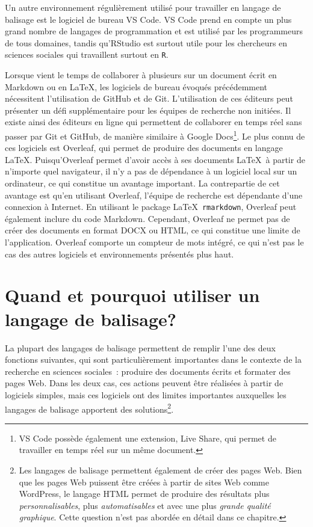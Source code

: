 \documentclass[
  letterpaper,
]{scrbook}
\begin{document}
Un autre environnement régulièrement utilisé pour travailler en langage
de balisage est le logiciel de bureau VS Code. VS Code prend en compte
un plus grand nombre de langages de programmation et est utilisé par les
programmeurs de tous domaines, tandis qu'RStudio est surtout utile pour
les chercheurs en sciences sociales qui travaillent surtout en
\texttt{R}.

Lorsque vient le temps de collaborer à plusieurs sur un document écrit
en Markdown ou en \LaTeX, les logiciels de bureau évoqués précédemment
nécessitent l'utilisation de GitHub et de Git. L'utilisation de ces
éditeurs peut présenter un défi supplémentaire pour les équipes de
recherche non initiées. Il existe ainsi des éditeurs en ligne qui
permettent de collaborer en temps réel sans passer par Git et GitHub, de
manière similaire à Google Docs\footnote{VS Code possède également une
  extension, Live Share, qui permet de travailler en temps réel sur un
  même document.}. Le plus connu de ces logiciels est Overleaf, qui
permet de produire des documents en langage \LaTeX. Puisqu'Overleaf
permet d'avoir accès à ses documents \LaTeX~à partir de n'importe quel
navigateur, il n'y a pas de dépendance à un logiciel local sur un
ordinateur, ce qui constitue un avantage important. La contrepartie de
cet avantage est qu'en utilisant Overleaf, l'équipe de recherche est
dépendante d'une connexion à Internet. En utilisant le package
\LaTeX~\texttt{rmarkdown}, Overleaf peut également inclure du code
Markdown. Cependant, Overleaf ne permet pas de créer des documents en
format DOCX ou HTML, ce qui constitue une limite de l'application.
Overleaf comporte un compteur de mots intégré, ce qui n'est pas le cas
des autres logiciels et environnements présentés plus haut.

\hypertarget{quand-et-pourquoi-utiliser-un-langage-de-balisage}{%
\section{Quand et pourquoi utiliser un langage de
balisage?}\label{quand-et-pourquoi-utiliser-un-langage-de-balisage}}

La plupart des langages de balisage permettent de remplir l'une des deux
fonctions suivantes, qui sont particulièrement importantes dans le
contexte de la recherche en sciences sociales~: produire des documents
écrits et formater des pages Web. Dans les deux cas, ces actions peuvent
être réalisées à partir de logiciels simples, mais ces logiciels ont des
limites importantes auxquelles les langages de balisage apportent des
solutions\footnote{Les langages de balisage permettent également de
  créer des pages Web. Bien que les pages Web puissent être créées à
  partir de sites Web comme WordPress, le langage HTML permet de
  produire des résultats plus \emph{personnalisables}, plus
  \emph{automatisables} et avec une plus \emph{grande qualité
  graphique}. Cette question n'est pas abordée en détail dans ce
  chapitre.}.
\end{document}
